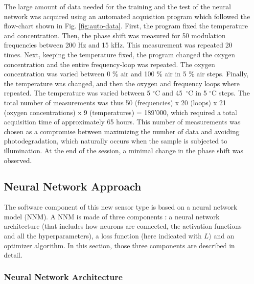 \documentclass[sensors,article,submit,moreauthors,pdftex,10pt,a4paper]{Definitions/mdpi}
\begin{document}
The large amount of data needed for the training and the test of the neural network was acquired using an automated acquisition program which followed the flow-chart shown in Fig. \ref{fig:auto-data}. First, the program fixed the temperature and concentration. Then, the phase shift was measured for 50 modulation frequencies between 200 Hz and 15 kHz. This measurement was repeated 20 times. Next, keeping the temperature fixed, the program changed the oxygen concentration and the entire frequency-loop was repeated.
The oxygen concentration was varied between 0 $\%$ air and 100 $\%$ air in 5 $\%$ air steps.
Finally, the temperature was changed, and then the oxygen and frequency loops where repeated. The temperature was varied between 5 $^\circ$C and 45~$^\circ$C in 5 $^\circ$C steps.
The total number of measurements was thus 50 (frequencies) x 20 (loops) x 21 (oxygen concentrations) x 9 (temperatures) = 189'000, which required a total acquisition time of approximately 65 hours. This number of measurements was chosen as a compromise between maximizing the number of data and avoiding photodegradation, which naturally occurs when the sample is subjected to illumination. At the end of the session, a minimal change in the phase shift was observed.



\subsection{Neural Network Approach}
\label{NN}

The software component of this new sensor type is based on a neural network model (NNM). A NNM is made of three components \cite{Michelucci2017}: a neural network architecture (that includes how neurons are connected, the activation functions and all the hyperparameters), a loss function (here indicated with $L$) and an optimizer algorithm. In this section, those three components are described in detail.

\subsubsection{Neural Network Architecture}
\end{document}
